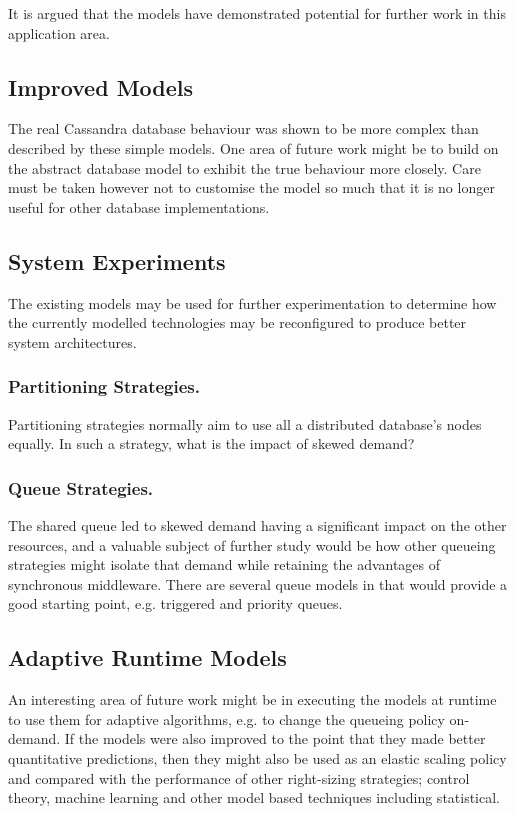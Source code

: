 It is argued that the models have demonstrated potential for further work in this application area.
	
\subsection{Improved Models}

The real Cassandra database behaviour was shown to be more complex than described by these simple models.  One area of future work might be to build on the abstract database model to exhibit the true behaviour more closely.  Care must be taken however not to customise the model so much that it is no longer useful for other database implementations.

\subsection{System Experiments}

The existing models may be used for further experimentation to determine how the currently modelled technologies may be reconfigured to produce better system architectures.

\subsubsection{Partitioning Strategies.}  Partitioning strategies normally aim to use all a distributed database's nodes equally.  In such a strategy, what is the impact of skewed demand?

\subsubsection{Queue Strategies.}  The shared queue led to skewed demand having a significant impact on the other resources, and a valuable subject of further study would be how other queueing strategies might isolate that demand while retaining the advantages of synchronous middleware.  There are several queue models in \cite{RN75} that would provide a good starting point, e.g. triggered and priority queues.

\subsection{Adaptive Runtime Models}
An interesting area of future work might be in executing the models at runtime to use them for adaptive algorithms, e.g. to change the queueing policy on-demand.  If the models were also improved to the point that they made better quantitative predictions, then they might also be used as an elastic scaling policy and compared with the performance of other right-sizing strategies; control theory, machine learning and other model based techniques including statistical.

